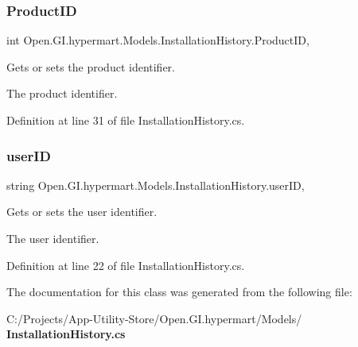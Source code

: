 \mbox{\label{class_open_1_1_g_i_1_1hypermart_1_1_models_1_1_installation_history_a42a9e298540659d4ef03d7bf2440fdae}} 
\subsubsection{Product\+ID}
{\footnotesize\ttfamily int Open.\+G\+I.\+hypermart.\+Models.\+Installation\+History.\+Product\+ID\hspace{0.3cm}{\ttfamily [get]}, {\ttfamily [set]}}



Gets or sets the product identifier. 

The product identifier. 

Definition at line 31 of file Installation\+History.\+cs.

\mbox{\label{class_open_1_1_g_i_1_1hypermart_1_1_models_1_1_installation_history_acfc4d740fbdade68a23eb93a577c9539}} 
\subsubsection{user\+ID}
{\footnotesize\ttfamily string Open.\+G\+I.\+hypermart.\+Models.\+Installation\+History.\+user\+ID\hspace{0.3cm}{\ttfamily [get]}, {\ttfamily [set]}}



Gets or sets the user identifier. 

The user identifier. 

Definition at line 22 of file Installation\+History.\+cs.



The documentation for this class was generated from the following file\+:\begin{DoxyCompactItemize}
\item 
C\+:/\+Projects/\+App-\/\+Utility-\/\+Store/\+Open.\+G\+I.\+hypermart/\+Models/\textbf{ Installation\+History.\+cs}\end{DoxyCompactItemize}
